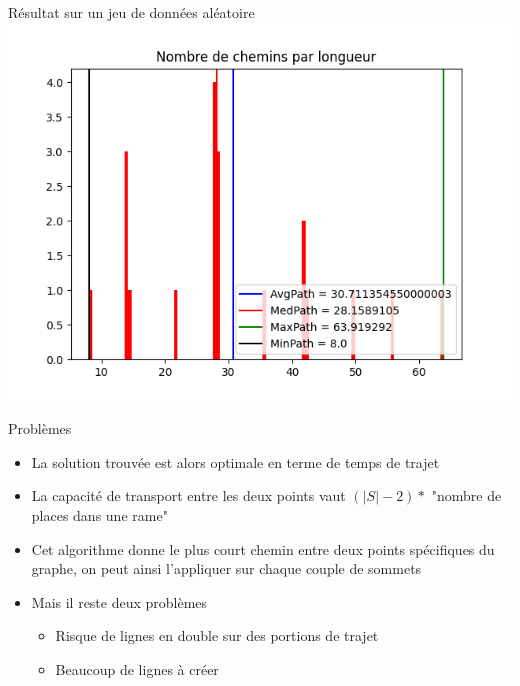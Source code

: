 \documentclass[aspectratio=43,11pt]{beamer}
\begin{document}
\begin{frame}{Résultat sur un jeu de données aléatoire}
    \centering
        \includegraphics[height=0.8\textheight]{sp_r}

\end{frame}
\begin{frame}{Problèmes}
    \begin{itemize}
        \item La solution trouvée est alors optimale en terme de temps de trajet
        \item La capacité de transport entre les deux points vaut $(|S| - 2) *$ "nombre de places dans une rame"
        \item Cet algorithme donne le plus court chemin entre deux points spécifiques du graphe, on peut ainsi l'appliquer sur chaque couple de sommets
        \item Mais il reste deux problèmes
        \begin{itemize}
            \item Risque de lignes en double sur des portions de trajet
            \item Beaucoup de lignes à créer
        \end{itemize}
    \end{itemize}
\end{frame}
\end{document}
